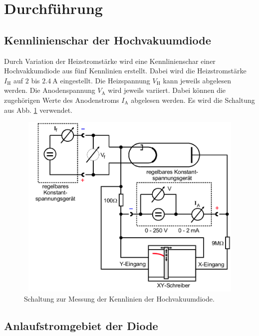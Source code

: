 \section{Durchführung}
\label{sec:Durchführung}

\subsection{Kennlinienschar der Hochvakuumdiode}
Durch Variation der Heizstromstärke wird eine Kennlinienschar 
einer Hochvakkumdiode aus fünf Kennlinien erstellt.
Dabei wird die Heizstromstärke $I_\text{H}$ auf $\num{2}$
bis $\SI{2.4}{\ampere}$ eingestellt.
Die Heizspannung $V_\text{H}$ kann jeweils abgelesen werden.
Die Anodenspannung $V_\text{A}$ wird jeweils variiert.
Dabei können die zugehörigen Werte des Anodenstroms $I_\text{A}$
abgelesen werden. Es wird die Schaltung aus Abb. \ref{fig:a}
verwendet.
\begin{figure}
    \centering
    \includegraphics[width=12cm, height=9cm]{build/a.png}
    \caption{Schaltung zur Messung der Kennlinien der Hochvakuumdiode. \cite{V504}}
    \label{fig:a}
\end{figure}

\subsection{Anlaufstromgebiet der Diode}

